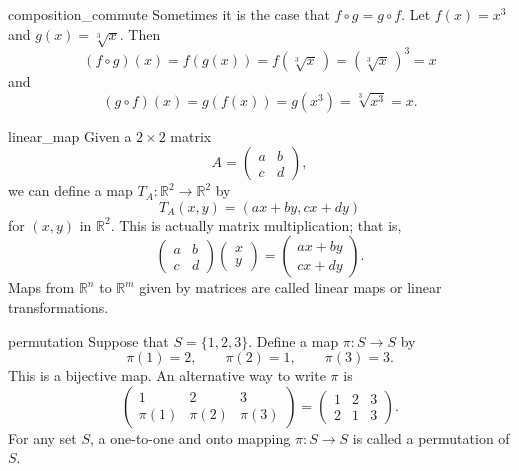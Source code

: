 \begin{example}{composition_commute}
Sometimes it is the case that $f \circ g= g \circ f$.  Let $f(x) = x^3$ and $g(x) = \sqrt[3]{x}$. Then 
\[
(f \circ g )(x) = f(g(x)) = f( \sqrt[3]{x}\, ) = (\sqrt[3]{x}\, )^3 = x
\]
and
\[
(g \circ f )(x) = g(f(x)) = g( x^3) = \sqrt[3]{ x^3} = x.
\]
\end{example}
 
\begin{example}{linear_map}
Given a $2 \times 2$ matrix
\[
A =
\begin{pmatrix}
a & b \\
c & d
\end{pmatrix},
\]
we can define a map $T_A : {\mathbb R}^2 \rightarrow {\mathbb R}^2$ by 
\[
T_A (x,y) = (ax + by, cx +dy)
\]
for $(x,y)$ in ${\mathbb R}^2$.  This is actually matrix multiplication; that is,
\[
\begin{pmatrix}
a & b \\
c & d
\end{pmatrix}
\begin{pmatrix}
x \\ y
\end{pmatrix}
=
\begin{pmatrix}
ax + by \\
cx +dy
\end{pmatrix}.
\]
Maps from ${\mathbb R}^n$ to ${\mathbb R}^m$ given by matrices are called {\bfi linear maps\/} or {\bfi linear transformations}.
\end{example}

\begin{example}{permutation}
Suppose that $S = \{ 1,2,3  \}$. Define a map $\pi :S\rightarrow S$ by 
\[
\pi( 1 )  = 2, \qquad
\pi( 2 )  = 1, \qquad
\pi( 3 )  = 3.
\]
This is a bijective map.  An alternative way to  write $\pi$ is
\[
\begin{pmatrix}
1 & 2 & 3 \\
\pi(1) & \pi(2) & \pi(3)
\end{pmatrix}
=
\begin{pmatrix}
1 & 2 & 3 \\
2 & 1 & 3
\end{pmatrix}.
\]
For any set $S$, a one-to-one and onto mapping $\pi : S \rightarrow S$ is called a {\bfi permutation\/} of $S$. 
\end{example}

